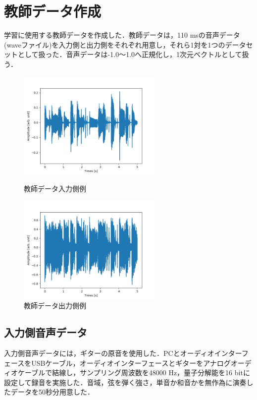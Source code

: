 \documentclass{jreport}		%
\begin{document}
\section{教師データ作成}
学習に使用する教師データを作成した．教師データは，110 msの音声データ(waveファイル)を入力側と出力側をそれぞれ用意し，それら1対を1つのデータセットとして扱った．音声データは-1.0～1.0へ正規化し，1次元ベクトルとして扱う．
\begin{figure}[htbp]
 \begin{minipage}{0.5\hsize}
 \begin{center}
  \includegraphics[width=70mm]{train_x0.png}
 \end{center}
 \caption{教師データ入力側例}
 \label{fig:one}
 \end{minipage}
 \begin{minipage}{0.5\hsize}
 \begin{center}
  \includegraphics[width=70mm]{train_y0.png}
 \end{center}
 \caption{教師データ出力側例}
 \label{fig:two}
 \end{minipage}
\end{figure}

\subsection{入力側音声データ}
入力側音声データには，ギターの原音を使用した．PCとオーディオインターフェースをUSBケーブル，オーディオインターフェースとギターをアナログオーディオケーブルで結線し，サンプリング周波数を48000 Hz，量子分解能を16 bitに設定して録音を実施した．音域，弦を弾く強さ，単音か和音かを無作為に演奏したデータを50秒分用意した．
\end{document}
